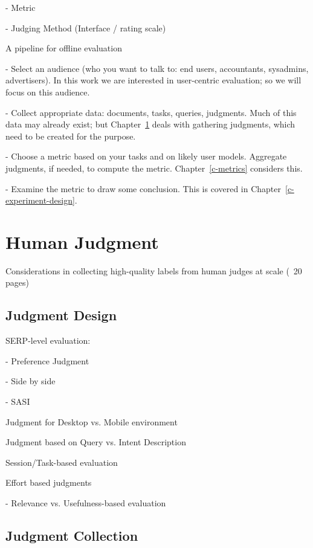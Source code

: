 \documentclass[openany]{now} %
\newcommand{\newpar}{\bigskip\noindent}
\begin{document}
-	Metric

-	Judging Method (Interface / rating scale) 

\newpar
A pipeline for offline evaluation

- Select an audience (who you want to talk to: end users, accountants, sysadmins, advertisers). In this work we are interested in user-centric evaluation; so we will focus on this audience.

- Collect appropriate data: documents, tasks, queries, judgments. Much of this data may already exist; but Chapter~\ref{c-human-judgment} deals with gathering judgments, which need to be created for the purpose.

- Choose a metric based on your tasks and on likely user models. Aggregate judgments, if needed, to compute the metric. Chapter~\ref{c-metrics} considers this.

- Examine the metric to draw some conclusion. This is covered in Chapter~\ref{c-experiment-design}.

\chapter{Human Judgment}
\label{c-human-judgment}
Considerations in collecting high-quality labels from human judges at scale (~20 pages)

\section{Judgment Design}

SERP-level evaluation: 

- Preference Judgment  \cite{Chandar2013} \cite{CarteretteBCD08}

- Side by side \cite{Thomas2006} \cite{Kim:2013}

- SASI \cite{Bailey2010} 

\newpar
Judgment for Desktop vs. Mobile environment \cite{Verma:2016:CRMD}

\newpar
Judgment based on Query vs. Intent Description \cite{Yilmaz:2014:EID}

\newpar
Session/Task-based evaluation \cite{Moraveji:2011} \cite{Xu:2009}

\newpar
Effort based judgments \cite{Yilmaz:2014} \cite{Verma:2016:EBJ}

- Relevance vs. Usefulness-based evaluation 

\section{Judgment Collection}
\end{document}
